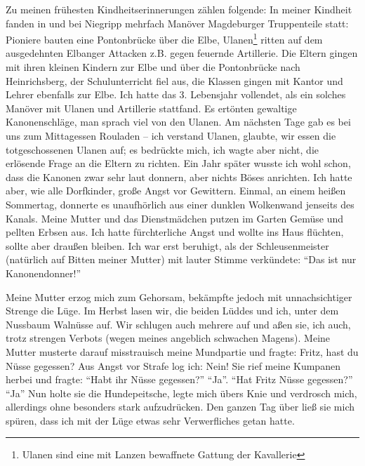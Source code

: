 \label{para:kindheitserinnerungen}Zu meinen frühesten Kindheitserinnerungen zählen folgende: In meiner Kindheit fanden in und bei Niegripp mehrfach Manöver Magdeburger Truppenteile statt: Pioniere bauten eine Pontonbrücke über die Elbe, Ulanen\footnote{Ulanen sind eine mit Lanzen bewaffnete Gattung der Kavallerie} ritten auf dem ausgedehnten Elbanger Attacken z.B. gegen feuernde Artillerie. Die Eltern gingen mit ihren kleinen Kindern zur Elbe und über die Pontonbrücke nach Heinrichsberg, der Schulunterricht fiel aus, die Klassen gingen mit Kantor und Lehrer ebenfalls zur Elbe. Ich hatte das 3. Lebensjahr vollendet, als ein solches Manöver mit Ulanen und Artillerie stattfand. Es ertönten gewaltige Kanonenschläge, man sprach viel von den Ulanen. Am nächsten Tage gab es bei uns zum Mittagessen Rouladen -- ich verstand Ulanen, glaubte, wir essen die totgeschossenen Ulanen auf; es bedrückte mich, ich wagte aber nicht, die erlösende Frage an die Eltern zu richten. Ein Jahr später wusste ich wohl schon, dass die Kanonen zwar sehr laut donnern, aber nichts Böses anrichten. Ich hatte aber, wie alle Dorfkinder, große Angst vor Gewittern. Einmal, an einem heißen Sommertag, donnerte es unaufhörlich aus einer dunklen Wolkenwand jenseits des Kanals. Meine Mutter und das Dienstmädchen putzen im Garten Gemüse und pellten Erbsen aus. Ich hatte fürchterliche Angst und wollte ins Haus flüchten, sollte aber draußen bleiben. Ich war erst beruhigt, als der Schleusenmeister (natürlich auf Bitten meiner Mutter) mit lauter Stimme verkündete: \enquote{Das ist nur Kanonendonner!}

Meine Mutter erzog mich zum Gehorsam, bekämpfte jedoch mit unnachsichtiger Strenge die Lüge. Im Herbst lasen wir, die beiden Lüddes und ich, unter dem Nussbaum Walnüsse auf. Wir schlugen auch mehrere auf und aßen sie, ich auch, trotz strengen Verbots (wegen meines angeblich schwachen Magens). Meine Mutter musterte darauf misstrauisch meine Mundpartie und fragte: Fritz, hast du Nüsse gegessen? Aus Angst vor Strafe log ich: Nein! Sie rief meine Kumpanen herbei und fragte: \enquote{Habt ihr Nüsse gegessen?} \enquote{Ja}. \enquote{Hat Fritz Nüsse gegessen?} \enquote{Ja} Nun holte sie die Hundepeitsche, legte mich übers Knie und verdrosch mich, allerdings ohne besonders stark aufzudrücken. Den ganzen Tag über ließ sie mich spüren, dass ich mit der Lüge etwas sehr Verwerfliches getan hatte.

